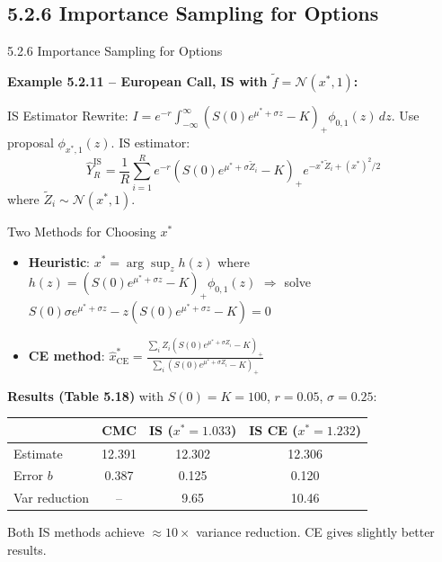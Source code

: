 \documentclass[aspectratio=169,10pt]{beamer}
\begin{document}
\subsection{5.2.6 Importance Sampling for Options}

\begin{frame}[allowframebreaks]{5.2.6 Importance Sampling for Options}

  \textbf{Example 5.2.11 -- European Call, IS with $\tilde{f} = \mathcal{N}(x^*, 1)$:}

  \begin{block}{IS Estimator}
    Rewrite: $I = e^{-r}\int_{-\infty}^\infty (S(0)e^{\mu^*+\sigma z}-K)_+\phi_{0,1}(z)\,dz$.
    Use proposal $\phi_{x^*,1}(z)$. IS estimator:
    \[
      \hat{Y}_R^{\mathrm{IS}} = \frac{1}{R}\sum_{i=1}^R
      e^{-r}(S(0)e^{\mu^*+\sigma\tilde{Z}_i}-K)_+ e^{-x^*\tilde{Z}_i+(x^*)^2/2}
    \]
    where $\tilde{Z}_i \sim \mathcal{N}(x^*, 1)$.
  \end{block}

  \begin{block}{Two Methods for Choosing $x^*$}
    \begin{itemize}
      \item \textbf{Heuristic}: $x^* = \arg\sup_z h(z)$ where
            $h(z) = (S(0)e^{\mu^*+\sigma z}-K)_+\phi_{0,1}(z)$
            $\Rightarrow$ solve $S(0)\sigma e^{\mu^*+\sigma z} - z(S(0)e^{\mu^*+\sigma z}-K) = 0$
      \item \textbf{CE method}: $\hat{x}^*_{\mathrm{CE}} = \frac{\sum_i Z_i(S(0)e^{\mu^*+\sigma Z_i}-K)_+}{\sum_i(S(0)e^{\mu^*+\sigma Z_i}-K)_+}$
    \end{itemize}
  \end{block}

  \framebreak

  \textbf{Results (Table 5.18)} with $S(0)=K=100$, $r=0.05$, $\sigma=0.25$:
  \begin{center}
    \small
    \begin{tabular}{lccc}
      \toprule
              & CMC    & IS ($x^*=1.033$) & IS CE ($x^*=1.232$) \\
      \midrule
      Estimate & 12.391 & 12.302 & 12.306 \\
      Error $b$ & 0.387 & 0.125 & 0.120 \\
      Var reduction & -- & 9.65 & 10.46 \\
      \bottomrule
    \end{tabular}
  \end{center}

  Both IS methods achieve $\approx 10\times$ variance reduction.
  CE gives slightly better results.

\end{frame}
\end{document}
